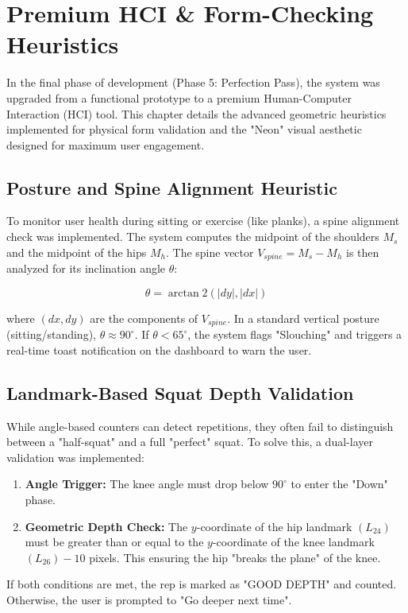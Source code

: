 \documentclass[a4paper,12pt]{report}
\begin{document}
\chapter{Premium HCI \& Form-Checking Heuristics}
\thispagestyle{contentpages}
\justifying

In the final phase of development (Phase 5: Perfection Pass), the system was upgraded from a functional prototype to a premium Human-Computer Interaction (HCI) tool. This chapter details the advanced geometric heuristics implemented for physical form validation and the "Neon" visual aesthetic designed for maximum user engagement.

\section{Posture and Spine Alignment Heuristic}
To monitor user health during sitting or exercise (like planks), a spine alignment check was implemented. The system computes the midpoint of the shoulders $M_s$ and the midpoint of the hips $M_h$. The spine vector $V_{spine} = M_s - M_h$ is then analyzed for its inclination angle $\theta$:

\[ \theta = \arctan2(|dy|, |dx|) \]

where $(dx, dy)$ are the components of $V_{spine}$. In a standard vertical posture (sitting/standing), $\theta \approx 90^\circ$. If $\theta < 65^\circ$, the system flags "Slouching" and triggers a real-time toast notification on the dashboard to warn the user.

\section{Landmark-Based Squat Depth Validation}
While angle-based counters can detect repetitions, they often fail to distinguish between a "half-squat" and a full "perfect" squat. To solve this, a dual-layer validation was implemented:
\begin{enumerate}
    \item \textbf{Angle Trigger:} The knee angle must drop below $90^\circ$ to enter the "Down" phase.
    \item \textbf{Geometric Depth Check:} The $y$-coordinate of the hip landmark $(L_{24})$ must be greater than or equal to the $y$-coordinate of the knee landmark $(L_{26}) - 10$ pixels. This ensuring the hip "breaks the plane" of the knee.
\end{enumerate}
If both conditions are met, the rep is marked as "GOOD DEPTH" and counted. Otherwise, the user is prompted to "Go deeper next time".
\end{document}
